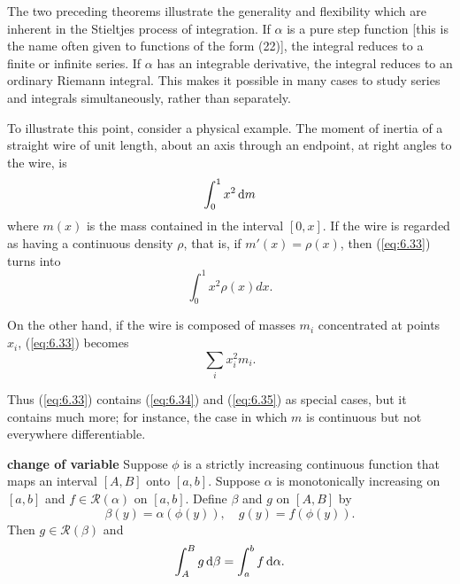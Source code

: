 \begin{myRemark}
    \label{myRemark:6.18}
    The two preceding theorems illustrate the generality and flexibility which are inherent in the Stieltjes process of integration. 
    If $\alpha$ is a pure step function 
    [this is the name often given to functions of the form (22)], 
    the integral reduces to a finite or infinite series. 
    If $\alpha$ has an integrable derivative, 
    the integral reduces to an ordinary Riemann integral. 
    This makes it possible in many cases to study series and integrals simultaneously, rather than separately.
    
    To illustrate this point, consider a physical example. 
    The moment of inertia of a straight wire of unit length, 
    about an axis through an endpoint, at right angles to the wire, is
    \begin{equation}
        \label{eq:6.33}
        \int_{0}^{1} x^2 \d m
    \end{equation}
    where $m(x)$ is the mass contained in the interval $[0, x]$. 
    If the wire is regarded as having a continuous density $\rho$, 
    that is, if $m'(x) = \rho(x)$, then (\ref{eq:6.33}) turns into
    \begin{equation}
        \label{eq:6.34}
        \int_{0}^{1} x^2 \rho(x) dx.
    \end{equation}
    
    On the other hand, 
    if the wire is composed of masses $m_i$ concentrated at points $x_i$, 
    (\ref{eq:6.33}) becomes
    \begin{equation}
        \label{eq:6.35}
        \sum_{i} x_i^2 m_i.
    \end{equation}
    
    Thus (\ref{eq:6.33}) contains (\ref{eq:6.34}) and (\ref{eq:6.35}) as special cases, but it contains much more; 
    for instance, the case in which $m$ is continuous but not everywhere differentiable.
\end{myRemark}

\begin{thm}
    \label{thm:6.19}
    \textbf{change of variable}
    Suppose $\phi$ is a strictly increasing continuous function that
    maps an interval $[A, B]$ onto $[a, b]$. 
    Suppose $\alpha$ is monotonically increasing on $[a, b]$ and
    $f \in \mathscr{R}(\alpha)$ on $[a, b]$. 
    Define $\beta$ and $g$ on $[A, B]$ by
    \begin{equation}
        \label{eq:6.36}
        \beta(y) = \alpha(\phi(y)),
        \quad 
        g(y) = f(\phi(y)).
    \end{equation}
    Then $g \in \mathscr{R}(\beta)$ and 
    \begin{equation}
        \label{eq:6.37}
        \int_{A}^{B} g \d \beta =
        \int_{a}^{b} f \d \alpha.
    \end{equation}
\end{thm}
